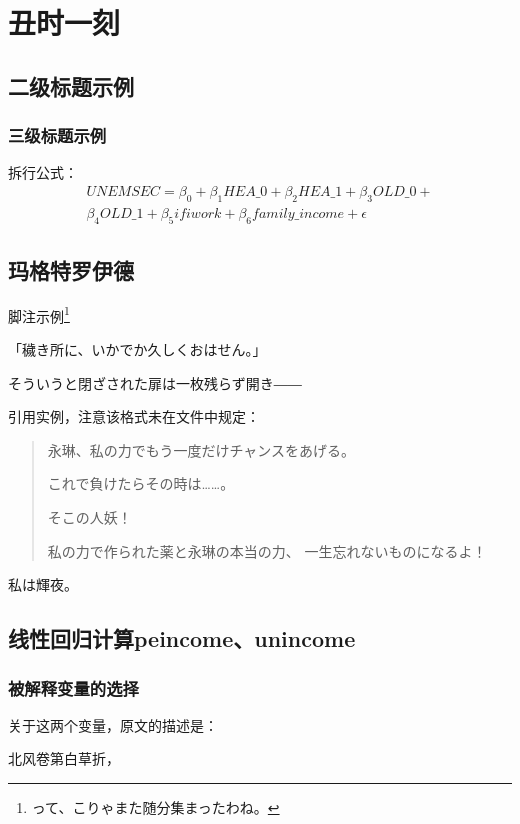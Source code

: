 \chapter{丑时一刻}
\section{二级标题示例}
\subsection{三级标题示例}
拆行公式：
\begin{equation}
    \begin{split}
        UNEMSEC = \beta_0 + \beta_1HEA\_0 + \beta_2HEA\_1 + \beta_3OLD\_0 + \\
        \beta_4OLD\_1 + \beta_5ifiwork + \beta_6family\_income + \epsilon
    \end{split}
\end{equation}

\lipsum[1]

\section{玛格特罗伊德}
脚注示例\footnote{って、こりゃまた随分集まったわね。}

「穢き所に、いかでか久しくおはせん。」

そういうと閉ざされた扉は一枚残らず開き――

引用实例，注意该格式未在文件中规定：
\begin{quotation}

    永琳、私の力でもう一度だけチャンスをあげる。

    これで負けたらその時は……。

    そこの人妖！

    私の力で作られた薬と永琳の本当の力、
    一生忘れないものになるよ！
\end{quotation}

私は輝夜。

\section{线性回归计算peincome、unincome}
\subsection{被解释变量的选择}
关于这两个变量，原文的描述是：
\lipsum[2]

北风卷第白草折，

